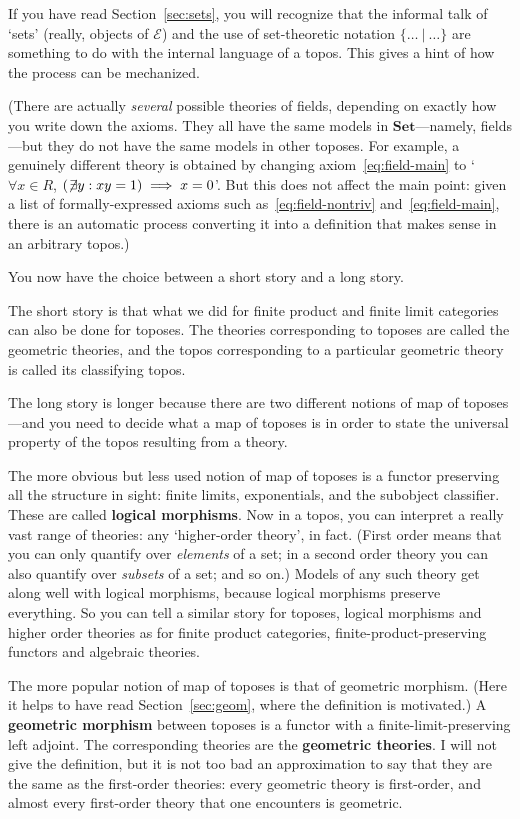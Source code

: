 \documentclass{article}
\newcommand{\cat}[1]{\mathscr{#1}}
\newcommand{\fcat}[1]{\mathbf{#1}}
\newcommand{\such}{\:|\:}
\newcommand{\Set}{\fcat{Set}}
\newcommand{\demph}[1]{\textbf{\textup{#1}}}
\newcommand{\E}{\cat{E}}
\begin{document}
If you have read Section~\ref{sec:sets}, you will recognize that the informal
talk of `sets' (really, objects of $\E$) and the use of set-theoretic notation
$\{ \ldots \such \ldots \}$ are something to do with the internal language of
a topos.  This gives a hint of how the process can be mechanized.

(There are actually \emph{several} possible theories of fields, depending on
exactly how you write down the axioms.  They all have the same models in
$\Set$---namely, fields---but they do not have the same models in other
toposes.  For example, a genuinely different theory is obtained by changing
axiom~\eqref{eq:field-main} to `$\forall x \in R$, $(\not\!\exists y: xy = 1)
\implies x = 0$'.  But this does not affect the main point: given a list of
formally-expressed axioms such as~\eqref{eq:field-nontriv}
and~\eqref{eq:field-main}, there is an automatic process converting it into a
definition that makes sense in an arbitrary topos.)

You now have the choice between a short story and a long story. 

The short story is that what we did for finite product and finite limit
categories can also be done for toposes.  The theories corresponding to
toposes are called the geometric theories, and the topos corresponding to a
particular geometric theory is called its classifying topos.

The long story is longer because there are two different notions of map of
toposes---and you need to decide what a map of toposes is in order to state
the universal property of the topos resulting from a theory.  

The more obvious but less used notion of map of toposes is a functor
preserving all the structure in sight: finite limits, exponentials, and the
subobject classifier.  These are called \demph{logical morphisms}.  Now in a
topos, you can interpret a really vast range of theories: any `higher-order
theory', in fact.  (First order means that you can only quantify over
\emph{elements} of a set; in a second order theory you can also quantify over
\emph{subsets} of a set; and so on.)  Models of any such theory get along well
with logical morphisms, because logical morphisms preserve everything.  So you
can tell a similar story for toposes, logical morphisms and higher order
theories as for finite product categories, finite-product-preserving functors
and algebraic theories.

The more popular notion of map of toposes is that of geometric
morphism.  (Here it helps to have read Section~\ref{sec:geom}, where the
definition is motivated.)  A \demph{geometric morphism} between toposes is a
functor with a finite-limit-preserving left adjoint.  The corresponding
theories are the \demph{geometric theories}.  I will not give the definition,
but it is not too bad an approximation to say that they are the same as the
first-order theories: every geometric theory is first-order, and almost every
first-order theory that one encounters is geometric.
\end{document}
